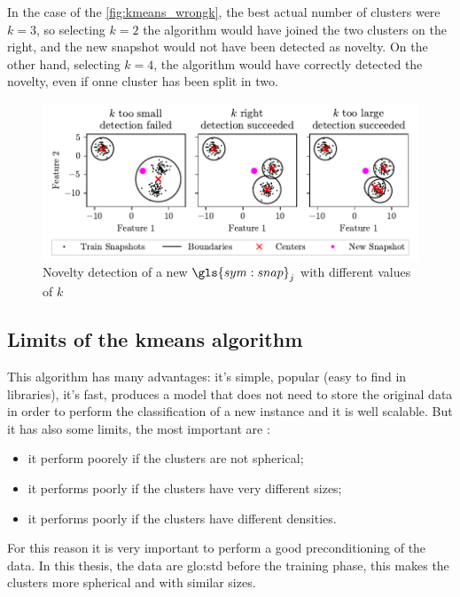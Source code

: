 In the case of the \autoref{fig:kmeans_wrongk}, the best actual number of clusters were $k=3$, so selecting $k=2$ the algorithm would have joined the two clusters on the right, and the new snapshot would not have been detected as novelty. On the other hand, selecting $k=4$, the algorithm would have correctly detected the novelty, even if onne cluster has been split in two.

\begin{figure}
  \centering
  \includegraphics[width=\textwidth]{images/Kmeans_wrongk.pdf}
  \caption{Novelty detection of a new $\gls{sym:snap}_j$ with different values of $k$}
  \label{fig:kmeans_wrongk}
\end{figure}


\subsection{Limits of the kmeans algorithm}
This algorithm has many advantages: it's simple, popular (easy to find in libraries), it's fast, produces a model that does not need to store the original data in order to perform the classification of a new instance and it is well scalable. But it has also some limits, the most important are \cite[p273]{hands-on-geron2022}:
\begin{itemize}
  \item it perform poorely if the clusters are not spherical;
  \item it performs poorly if the clusters have very different sizes;
  \item it performs poorly if the clusters have different densities.
\end{itemize}

For this reason it is very important to perform a good preconditioning of the data. In this thesis, the data are \gls{glo:std} before the training phase, this makes the clusters more spherical and with similar sizes. 



